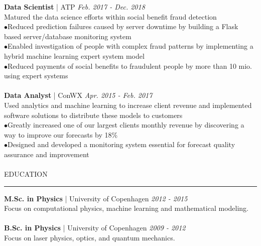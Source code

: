 \documentclass[11pt,a4paper]{article}
\newcommand{\textline}[3]{\normalsize \textbf{#1} | #2 \hfill \textit{#3}}
\newcommand{\headline}[1]{\Large \textcolor{myblue}{#1}}
\newcommand{\accomplishment}[1]{{\hspace*{-9pt}\textcolor{myblue}{$\bullet$}}\hspace*{4pt}\linespread{1.1}\footnotesize#1}
\begin{document}
\begin{minipage}[t]{0.66\linewidth}
    \textline{Data Scientist}{ATP}{Feb. 2017 - Dec. 2018}\\
    \footnotesize Matured the data science efforts within social benefit fraud detection\\
    \accomplishment{Reduced prediction failures caused by server downtime by building a Flask based server/database monitoring system}\\
    \accomplishment{Enabled investigation of people with complex fraud patterns by implementing a hybrid machine learning expert system model}\\
    \accomplishment{Reduced payments of social benefits to fraudulent people by more than 10 mio. using expert systems}\\
    \\
    \textline{Data Analyst}{ConWX}{Apr. 2015 - Feb. 2017}\\
    \footnotesize Used analytics and machine learning to increase client revenue and implemented software solutions to distribute these models to customers\\
    \accomplishment{Greatly increased one of our largest clients monthly revenue by discovering a way to improve our forecasts by 18\%}\\
    \accomplishment{Designed and developed a monitoring system essential for forecast quality assurance and improvement}\\
    \\

    {\headline{EDUCATION}}
    \vspace{0.2cm}
    {\color{myblue}\hrule height 0.3mm}
    \vspace{0.2cm}

    \textline{M.Sc. in Physics}{University of Copenhagen}{2012 - 2015}\\
    \footnotesize Focus on computational physics, machine learning and mathematical modeling.\\
    \\
    \textline{B.Sc. in Physics}{University of Copenhagen}{2009 - 2012}\\
    \footnotesize Focus on laser physics, optics, and quantum mechanics.\\
    \\


\end{minipage}
\end{document}
